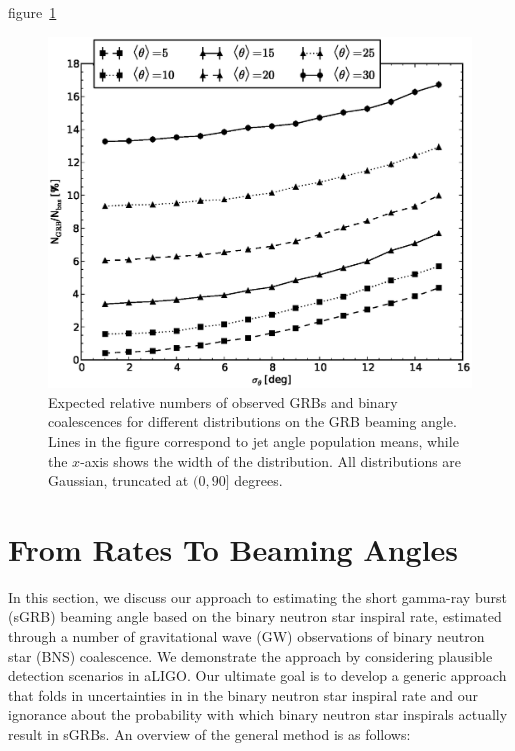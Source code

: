 \documentclass[twocolumn,nofootinbib]{revtex4-1}
\def\bns#1{binary neutron star#1 (BNS#1)\gdef\bns{BNS}}
\def\gw#1{gravitational wave#1 (GW#1)\gdef\gw{GW}}
\def\sgrb#1{short gamma-ray burst#1 (sGRB#1)\gdef\sgrb{sGRB}}
\begin{document}
figure~\ref{fig:thetapop}
 

\begin{figure}
\centering
\includegraphics[width=\linewidth]{theta_dist_grbfrac.eps}
\caption{\label{fig:thetapopulation} Expected relative
numbers of observed GRBs and binary coalescences for different distributions
on the GRB beaming angle.  Lines in the figure correspond to jet angle
population means, while the $x$-axis shows the width of the distribution.  All 
distributions are Gaussian, truncated at $(0, 90]$ degrees.\label{fig:thetapop}}
\end{figure}


\section{From Rates To Beaming Angles}

In this section, we discuss our approach to estimating the \sgrb{} beaming
angle based on the binary neutron star inspiral rate, estimated through a number
of \gw{} observations of \bns{} coalescence. We demonstrate the approach by
considering plausible detection scenarios in aLIGO.  Our ultimate goal is to
develop a generic approach that folds in uncertainties in in the binary neutron
star inspiral rate and our ignorance about the probability with which binary
neutron star inspirals actually result in \sgrb{s}.
%
An overview of the general method is as follows:
\end{document}
